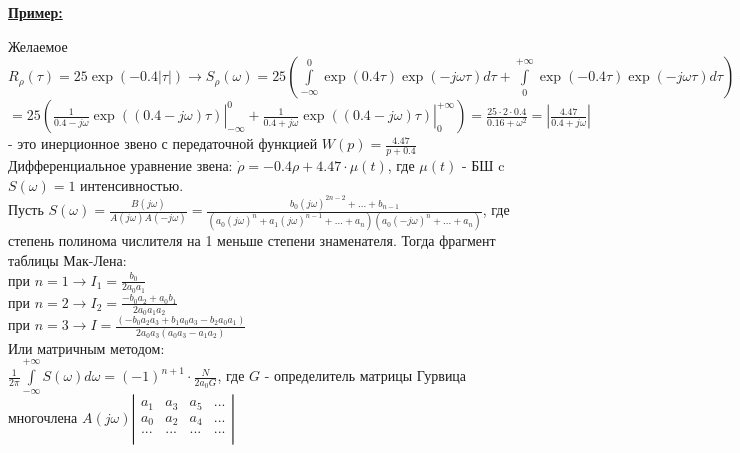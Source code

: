 \documentclass[preprint,russian,a5paper,10pt,twoside,mediummath]{ncc}
\newcommand{\ExampleMy}{\vspace{\baselineskip}\textbf{\underline{Пример:}}\nopagebreak\par}
\begin{document}
\ExampleMy Желаемое ${{R}_{\rho }}\left( \tau  \right)=25\exp \left( -0.4\left| \tau  \right| \right)\to {{S}_{\rho }}\left( \omega  \right)=25\left( \int\limits_{-\infty }^{0}{\exp \left( 0.4\tau  \right)\exp \left( -j\omega \tau  \right)d\tau +\int\limits_{0}^{+\infty }{\exp \left( -0.4\tau  \right)\exp \left( -j\omega \tau  \right)d\tau }} \right)=25\left( \int\limits_{-\infty }^{0}{\exp \left( 0.4j\omega \tau  \right)d\tau +\int\limits_{0}^{+\infty }{\exp \left( -0.4-j\omega  \right)\tau d\tau }} \right)$ $=25\left( \left. \frac{1}{0.4-j\omega }\exp \left( \left( 0.4-j\omega  \right)\tau  \right) \right|_{-\infty }^{0}+\left. \frac{1}{0.4+j\omega }\exp \left( \left( 0.4-j\omega  \right)\tau  \right) \right|_{0}^{+\infty } \right)=\frac{25\cdot 2\cdot 0.4}{0.16+{{\omega }^{2}}}=\left| \frac{4.47}{0.4+j\omega } \right|$ - это инерционное звено с передаточной функцией $W\left( p \right)=\frac{4.47}{p+0.4}$
\\Дифференциальное уравнение звена: $\dot{\rho }=-0.4\rho +4.47\cdot \mu \left( t \right)$, где $\mu \left( t \right)$ - БШ c $S\left( \omega  \right)=1$ интенсивностью.
\\Пусть $S\left( \omega  \right)=\frac{B\left( j\omega  \right)}{A\left( j\omega  \right)A\left( -j\omega  \right)}=\frac{{{b}_{0}}{{\left( j\omega  \right)}^{2n-2}}+...+{{b}_{n-1}}}{\left( {{a}_{0}}{{\left( j\omega  \right)}^{n}}+{{a}_{1}}{{\left( j\omega  \right)}^{n-1}}+...+{{a}_{n}} \right)\left( {{a}_{0}}{{\left( -j\omega  \right)}^{n}}+...+{{a}_{n}} \right)}$, где степень полинома числителя на 1 меньше степени знаменателя. Тогда фрагмент таблицы Мак-Лена:
\\при $n=1\to {{I}_{1}}=\frac{{{b}_{0}}}{2{{a}_{0}}{{a}_{1}}}$ 
\\при $n=2\to {{I}_{2}}=\frac{-{{b}_{0}}{{a}_{2}}+{{a}_{0}}{{b}_{1}}}{2{{a}_{0}}{{a}_{1}}{{a}_{2}}}$
\\при $n=3\to I=\frac{\left( -{{b}_{0}}{{a}_{2}}{{a}_{3}}+{{b}_{1}}{{a}_{0}}{{a}_{3}}-{{b}_{2}}{{a}_{0}}{{a}_{1}} \right)}{2{{a}_{0}}{{a}_{3}}\left( {{a}_{0}}{{a}_{3}}-{{a}_{1}}{{a}_{2}} \right)}$
\\Или матричным методом: 
\\$\frac{1}{2\pi }\int\limits_{-\infty }^{+\infty }{S\left( \omega  \right)}d\omega ={{\left( -1 \right)}^{n+1}}\cdot \frac{N}{2{{a}_{0}}G}$, где $G$ - определитель матрицы Гурвица многочлена  
$A\left( j\omega  \right)\left| \begin{matrix}
   {{a}_{1}} & {{a}_{3}} & {{a}_{5}} & ...  \\
   {{a}_{0}} & {{a}_{2}} & {{a}_{4}} & ...  \\
   ... & ... & ... & ...  \\
\end{matrix} \right|$
\end{document}

